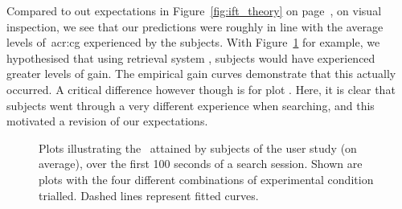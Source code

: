 Compared to out expectations in Figure~\ref{fig:ift_theory} on page~\pageref{fig:ift_theory}, on visual inspection, we see that our predictions were roughly in line with the average levels of~\gls{acr:cg} experienced by the subjects. With Figure~\ref{fig:ift_empirical}  for example, we hypothesised that using retrieval system , subjects would have experienced greater levels of gain. The empirical gain curves demonstrate that this actually occurred. A critical difference however though is for plot . Here, it is clear that subjects went through a very different experience when searching, and this motivated a revision of our expectations.

\begin{figure}[t!]
    \centering
    \caption[\gls{acr:ift} and diversification: empirical results]{Plots illustrating the~ attained by subjects of the user study (on average), over the first 100 seconds of a search session. Shown are plots with the four different combinations of experimental condition trialled. Dashed lines represent fitted curves.}
    \label{fig:ift_empirical}
\end{figure}

